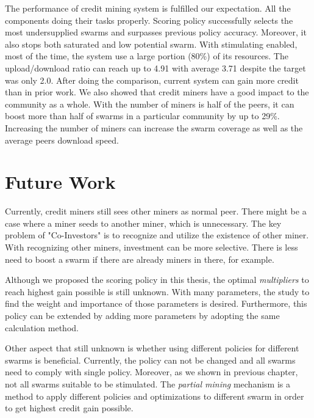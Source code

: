 The performance of credit mining system is fulfilled our expectation. All the components doing their tasks properly. Scoring policy successfully selects the most undersupplied swarms and surpasses previous policy accuracy. Moreover, it also stops both saturated and low potential swarm. With stimulating enabled, most of the time, the system use a large portion (80\%) of its resources. The upload/download ratio can reach up to 4.91 with average 3.71 despite the target was only 2.0. After doing the comparison, current system can gain more credit than in prior work. We also showed that credit miners have a good impact to the community as a whole. With the number of miners is half of the peers, it can boost more than half of swarms in a particular community by up to 29\%. Increasing the number of miners can increase the swarm coverage as well as the average peers download speed.

\section{Future Work}
Currently, credit miners still sees other miners as normal peer. There might be a case where a miner seeds to another miner, which is unnecessary. The key problem of "Co-Investors" is to recognize and utilize the existence of other miner. With recognizing other miners, investment can be more selective. There is less need to boost a swarm if there are already miners in there, for example. 

Although we proposed the scoring policy in this thesis, the optimal \textit{multipliers} to reach highest gain possible is still unknown. With many parameters, the study to find the weight and importance of those parameters is desired. Furthermore, this policy can be extended by adding more parameters by adopting the same calculation method.

Other aspect that still unknown is whether using different policies for different swarms is beneficial. Currently, the policy can not be changed and all swarms need to comply with single policy. Moreover, as we shown in previous chapter, not all swarms suitable to be stimulated. The \textit{partial mining} mechanism is a method to apply different policies and optimizations to different swarm in order to get highest credit gain possible. 